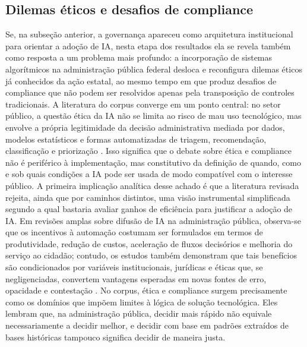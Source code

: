 \documentclass[12pt,a4paper]{article}
\begin{document}
\subsection{Dilemas éticos e desafios de compliance}
\label{sec:org56e5b82}
Se, na subseção anterior, a governança apareceu como arquitetura institucional para orientar a adoção de IA, nesta etapa dos resultados ela se revela também como resposta a um problema mais profundo: a incorporação de sistemas algorítmicos na administração pública federal desloca e reconfigura dilemas éticos já conhecidos da ação estatal, ao mesmo tempo em que produz desafios de compliance que não podem ser resolvidos apenas pela transposição de controles tradicionais. A literatura do corpus converge em um ponto central: no setor público, a questão ética da IA não se limita ao risco de mau uso tecnológico, mas envolve a própria legitimidade da decisão administrativa mediada por dados, modelos estatísticos e formas automatizadas de triagem, recomendação, classificação e priorização \autocite{serra2024a} \autocite{criado2024artificial} \autocite{sigfrids2022how}. Isso significa que o debate sobre ética e compliance não é periférico à implementação, mas constitutivo da definição de quando, como e sob quais condições a IA pode ser usada de modo compatível com o interesse público.
A primeira implicação analítica desse achado é que a literatura revisada rejeita, ainda que por caminhos distintos, uma visão instrumental simplificada segundo a qual bastaria avaliar ganhos de eficiência para justificar a adoção de IA. Em revisões amplas sobre difusão de IA na administração pública, observa-se que os incentivos à automação costumam ser formulados em termos de produtividade, redução de custos, aceleração de fluxos decisórios e melhoria do serviço ao cidadão; contudo, os estudos também demonstram que tais benefícios são condicionados por variáveis institucionais, jurídicas e éticas que, se negligenciadas, convertem vantagens esperadas em novas fontes de erro, opacidade e contestação \autocite{madan2022ai} \autocite{alhosani2024opportunities} \autocite{pi2021machine}. No corpus, ética e compliance surgem precisamente como os domínios que impõem limites à lógica de solução tecnológica. Eles lembram que, na administração pública, decidir mais rápido não equivale necessariamente a decidir melhor, e decidir com base em padrões extraídos de bases históricas tampouco significa decidir de maneira justa.
\end{document}
